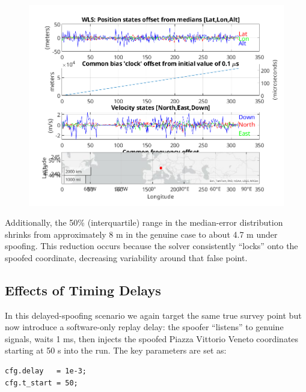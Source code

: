         \begin{figure}[h!]
            \centering
            \includegraphics[width=0.9\columnwidth]{images/tests/Monte_Cappuccini/Spoofing/task5_figures/Samsung_A51_Monte_Cappuccini_fig5.png}
            \caption{}
        \end{figure}

        
        \noindent Additionally, the 50\% (interquartile) range in the median-error distribution shrinks from approximately 8 m in the genuine case to about 4.7 m under spoofing. 
        This reduction occurs because the solver consistently “locks” onto the spoofed coordinate, decreasing variability around that false point.

    \subsection{Effects of Timing Delays}

        In this delayed-spoofing scenario we again target the same true survey point but now introduce a software-only replay delay: the spoofer “listens” to genuine signals, waits 1 ms, then injects the spoofed Piazza Vittorio Veneto coordinates starting at 50 s into the run. 
        The key parameters are set as:

        \begin{verbatim}
cfg.delay   = 1e-3;
cfg.t_start = 50;
        \end{verbatim}


